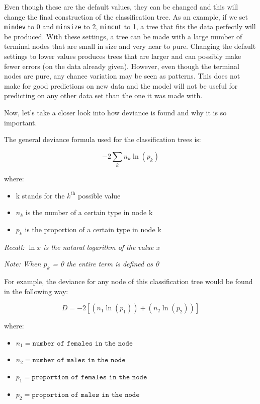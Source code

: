 \documentclass[12pt,twoside]{reedthesis}
\providecommand{\tightlist}{%
  \setlength{\itemsep}{0pt}\setlength{\parskip}{0pt}}
\begin{document}
  Even though these are the default values, they can be changed and this
  will change the final construction of the classification tree. As an
  example, if we set \texttt{mindev} to 0 and \texttt{minsize} to 2,
  \texttt{mincut} to 1, a tree that fits the data perfectly will be
  produced. With these settings, a tree can be made with a large number of
  terminal nodes that are small in size and very near to pure. Changing
  the default settings to lower values produces trees that are larger and
  can possibly make fewer errors (on the data already given). However,
  even though the terminal nodes are pure, any chance variation may be
  seen as patterns. This does not make for good predictions on new data
  and the model will not be useful for predicting on any other data set
  than the one it was made with.
  
  Now, let's take a closer look into how deviance is found and why it is
  so important.
  
  The general deviance formula used for the classification trees is:
  
  \[-2 \sum_{k}n_{k}\ln(p_{k})\]
  
  where:
  
  \begin{itemize}
  \tightlist
  \item
    k stands for the \(k^{\text{th}}\) possible value
  \item
    \(n_{k}\) is the number of a certain type in node k\\
  \item
    \(p_{k}\) is the proportion of a certain type in node k
  \end{itemize}
  
  \emph{Recall: \(\ln{x}\) is the natural logarithm of the value x}
  
  \emph{Note: When \(p_{k}\) = 0 the entire term is defined as 0}
  
  \newpage
  
  For example, the deviance for any node of this classification tree would
  be found in the following way:
  
  \[D = -2[(n_{1}\ln(p_{1})) + (n_{2}\ln(p_{2}))]\]
  
  where:
  
  \begin{itemize}
  \tightlist
  \item
    \(n_{1} = \texttt{number of females in the node}\)
  \item
    \(n_{2} = \texttt{number of males in the node}\)
  \item
    \(p_{1} = \texttt{proportion of females in the node}\)
  \item
    \(p_{2} = \texttt{proportion of males in the node}\)
  \end{itemize}
  
\end{document}
